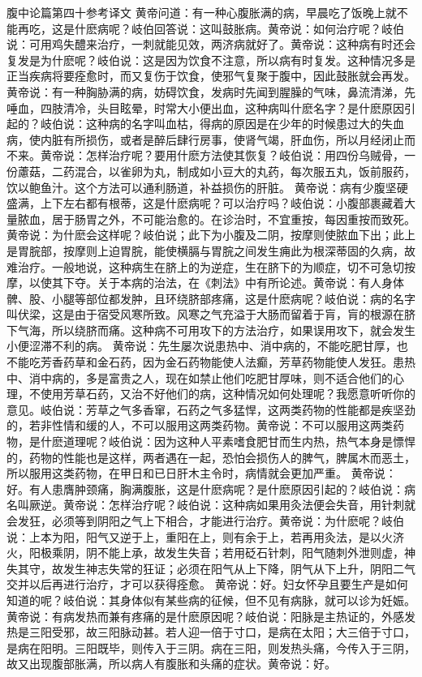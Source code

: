 \documentclass[12pt,UTF8]{ctexbook}
\begin{document}
腹中论篇第四十参考译文
黄帝问道：有一种心腹胀满的病，早晨吃了饭晚上就不能再吃，这是什麽病呢？岐伯回答说：这叫鼓胀病。黄帝说：如何治疗呢？岐伯说：可用鸡失醴来治疗，一刺就能见效，两济病就好了。黄帝说：这种病有时还会复发是为什麽呢？岐伯说：这是因为饮食不注意，所以病有时复发。这种情况多是正当疾病将要痊愈时，而又复伤于饮食，使邪气复聚于腹中，因此鼓胀就会再发。
黄帝说：有一种胸胁满的病，妨碍饮食，发病时先闻到腥臊的气味，鼻流清涕，先唾血，四肢清冷，头目眩晕，时常大小便出血，这种病叫什麽名字？是什麽原因引起的？岐伯说：这种病的名字叫血枯，得病的原因是在少年的时候患过大的失血病，使内脏有所损伤，或者是醉后肆行房事，使肾气竭，肝血伤，所以月经闭止而不来。黄帝说：怎样治疗呢？要用什麽方法使其恢复？岐伯说：用四份乌贼骨，一份藘菇，二药混合，以雀卵为丸，制成如小豆大的丸药，每次服五丸，饭前服药，饮以鲍鱼汁。这个方法可以通利肠道，补益损伤的肝脏。
黄帝说：病有少腹坚硬盛满，上下左右都有根蒂，这是什麽病呢？可以治疗吗？岐伯说：小腹部裹藏着大量脓血，居于肠胃之外，不可能治愈的。在诊治时，不宜重按，每因重按而致死。黄帝说：为什麽会这样呢？岐伯说；此下为小腹及二阴，按摩则使脓血下出；此上是胃脘部，按摩则上迫胃脘，能使横膈与胃脘之间发生痈此为根深蒂固的久病，故难治疗。一般地说，这种病生在脐上的为逆症，生在脐下的为顺症，切不可急切按摩，以使其下夺。关于本病的治法，在《刺法》中有所论述。黄帝说：有人身体髀、股、小腿等部位都发肿，且环绕脐部疼痛，这是什麽病呢？岐伯说：病的名字叫伏梁，这是由于宿受风寒所致。风寒之气充溢于大肠而留着于肓，肓的根源在脐下气海，所以绕脐而痛。这种病不可用攻下的方法治疗，如果误用攻下，就会发生小便涩滞不利的病。
黄帝说：先生屡次说患热中、消中病的，不能吃肥甘厚，也不能吃芳香药草和金石药，因为金石药物能使人法癫，芳草药物能使人发狂。患热中、消中病的，多是富贵之人，现在如禁止他们吃肥甘厚味，则不适合他们的心理，不使用芳草石药，又治不好他们的病，这种情况如何处理呢？我愿意听听你的意见。岐伯说：芳草之气多香窜，石药之气多猛悍，这两类药物的性能都是疾坚劲的，若非性情和缓的人，不可以服用这两类药物。黄帝说：不可以服用这两类药物，是什麽道理呢？岐伯说：因为这种人平素嗜食肥甘而生内热，热气本身是慓悍的，药物的性能也是这样，两者遇在一起，恐怕会损伤人的脾气，脾属木而恶土，所以服用这类药物，在甲日和已日肝木主令时，病情就会更加严重。
黄帝说：好。有人患膺肿颈痛，胸满腹胀，这是什麽病呢？是什麽原因引起的？岐伯说：病名叫厥逆。黄帝说：怎样治疗呢？岐伯说：这种病如果用灸法便会失音，用针刺就会发狂，必须等到阴阳之气上下相合，才能进行治疗。黄帝说：为什麽呢？岐伯说：上本为阳，阳气又逆于上，重阳在上，则有余于上，若再用灸法，是以火济火，阳极乘阴，阴不能上承，故发生失音；若用砭石针刺，阳气随刺外泄则虚，神失其守，故发生神志失常的狂证；必须在阳气从上下降，阴气从下上升，阴阳二气交并以后再进行治疗，才可以获得痊愈。
黄帝说：好。妇女怀孕且要生产是如何知道的呢？岐伯说：其身体似有某些病的征候，但不见有病脉，就可以诊为妊娠。
黄帝说：有病发热而兼有疼痛的是什麽原因呢？岐伯说：阳脉是主热证的，外感发热是三阳受邪，故三阳脉动甚。若人迎一倍于寸口，是病在太阳；大三倍于寸口，是病在阳明。三阳既毕，则传入于三阴。病在三阳，则发热头痛，今传入于三阴，故又出现腹部胀满，所以病人有腹胀和头痛的症状。黄帝说：好。
\end{document}
